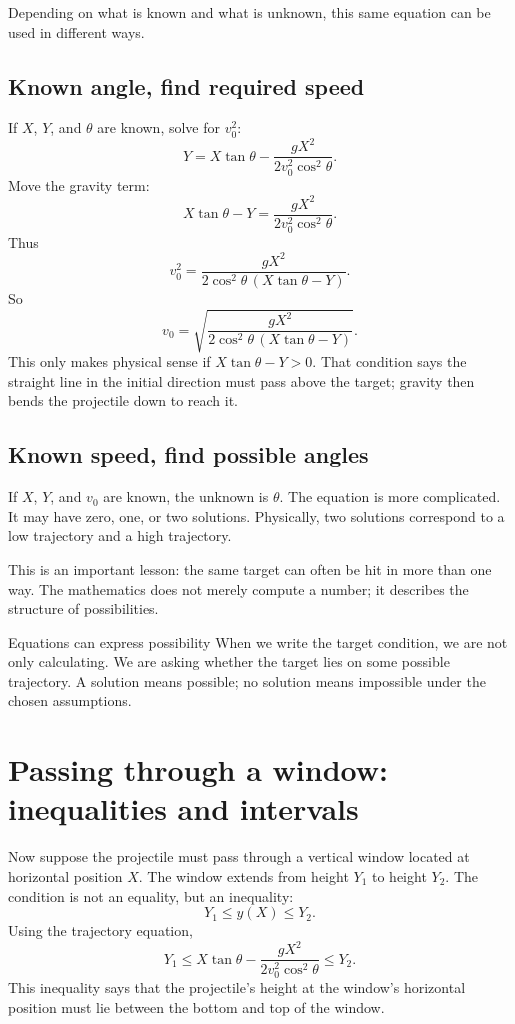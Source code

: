 \documentclass[11pt,a4paper]{article}
\begin{document}
Depending on what is known and what is unknown, this same equation can be used in different ways.

\subsection{Known angle, find required speed}

If $X$, $Y$, and $\theta$ are known, solve for $v_0^2$:
\[
Y=X\tan\theta-\frac{gX^2}{2v_0^2\cos^2\theta}.
\]
Move the gravity term:
\[
X\tan\theta-Y=\frac{gX^2}{2v_0^2\cos^2\theta}.
\]
Thus
\[
v_0^2=\frac{gX^2}{2\cos^2\theta\,(X\tan\theta-Y)}.
\]
So
\[
\boxed{v_0=\sqrt{\frac{gX^2}{2\cos^2\theta\,(X\tan\theta-Y)}}.}
\]
This only makes physical sense if $X\tan\theta-Y>0$. That condition says the straight line in the initial direction must pass above the target; gravity then bends the projectile down to reach it.

\subsection{Known speed, find possible angles}

If $X$, $Y$, and $v_0$ are known, the unknown is $\theta$. The equation is more complicated. It may have zero, one, or two solutions. Physically, two solutions correspond to a low trajectory and a high trajectory.

This is an important lesson: the same target can often be hit in more than one way. The mathematics does not merely compute a number; it describes the structure of possibilities.

\begin{principlebox}{Equations can express possibility}
When we write the target condition, we are not only calculating. We are asking whether the target lies on some possible trajectory. A solution means possible; no solution means impossible under the chosen assumptions.
\end{principlebox}

\section{Passing through a window: inequalities and intervals}

Now suppose the projectile must pass through a vertical window located at horizontal position $X$. The window extends from height $Y_1$ to height $Y_2$. The condition is not an equality, but an inequality:
\[
Y_1\le y(X)\le Y_2.
\]
Using the trajectory equation,
\[
Y_1\le X\tan\theta-\frac{gX^2}{2v_0^2\cos^2\theta}\le Y_2.
\]
This inequality says that the projectile's height at the window's horizontal position must lie between the bottom and top of the window.
\end{document}
